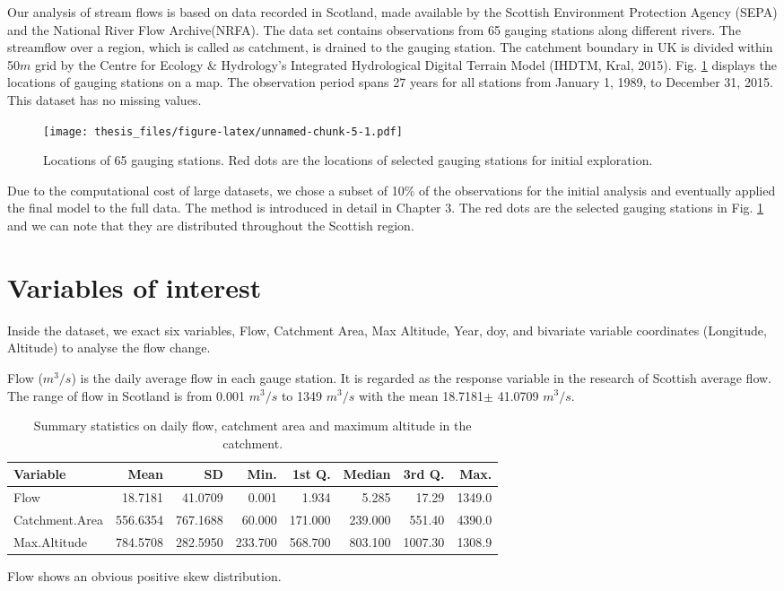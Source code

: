 \documentclass[12pt,oneside]{reedthesis}
\begin{document}
Our analysis of stream flows is based on data recorded in Scotland, made available by the Scottish Environment Protection Agency (SEPA) and the National River Flow Archive(NRFA). The data set contains observations from 65 gauging stations along different rivers. The streamflow over a region, which is called as catchment, is drained to the gauging station. The catchment boundary in UK is divided within 50\(m\) grid by the Centre for Ecology \& Hydrology's Integrated Hydrological Digital Terrain Model (IHDTM, Kral, 2015). Fig. \ref{fig:map} displays the locations of gauging stations on a map. The observation period spans 27 years for all stations from January 1, 1989, to December 31, 2015. This dataset has no missing values.
\begin{figure}
\centering
\texttt{[image: thesis\_files/figure-latex/unnamed-chunk-5-1.pdf]}
\caption{\label{fig:unnamed-chunk-5}\label{fig:map} Locations of 65 gauging stations. Red dots are the locations of selected gauging stations for initial exploration.}
\end{figure}
Due to the computational cost of large datasets, we chose a subset of 10\% of the observations for the initial analysis and eventually applied the final model to the full data. The method is introduced in detail in Chapter 3. The red dots are the selected gauging stations in Fig. \ref{fig:map} and we can note that they are distributed throughout the Scottish region.

\hypertarget{variables-of-interest}{%
\section{Variables of interest}\label{variables-of-interest}}

Inside the dataset, we exact six variables, Flow, Catchment Area, Max Altitude, Year, doy, and bivariate variable coordinates (Longitude, Altitude) to analyse the flow change.

Flow (\(m^3/s\)) is the daily average flow in each gauge station. It is regarded as the response variable in the research of Scottish average flow. The range of flow in Scotland is from 0.001 \(m^3/s\) to 1349 \(m^3/s\) with the mean 18.7181\(\pm\) 41.0709 \(m^3/s\).
\begin{table}[!h]

\caption{\label{tab:unnamed-chunk-6}\label{tab:summary} Summary statistics on daily flow, catchment area and maximum altitude in the catchment.}
\centering
\fontsize{10}{12}\selectfont
\begin{tabular}[t]{lrrrrrrr}
\toprule
Variable & Mean & SD & Min. & 1st Q. & Median & 3rd Q. & Max.\\
\midrule
Flow & 18.7181 & 41.0709 & 0.001 & 1.934 & 5.285 & 17.29 & 1349.0\\
Catchment.Area & 556.6354 & 767.1688 & 60.000 & 171.000 & 239.000 & 551.40 & 4390.0\\
Max.Altitude & 784.5708 & 282.5950 & 233.700 & 568.700 & 803.100 & 1007.30 & 1308.9\\
\bottomrule
\end{tabular}
\end{table}
Flow shows an obvious positive skew distribution.
\end{document}
